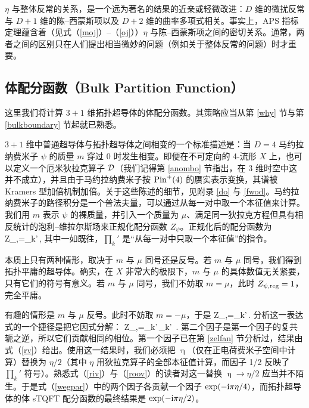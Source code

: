 $\eta$ 与整体反常的关系，是一个远为著名的结果的近亲或轻微改进：$D$ 维的微扰反常与 $D+1$ 维的陈--西蒙斯项以及 $D+2$ 维的曲率多项式相关。事实上，APS 指标定理蕴含着（见式（\ref{moj}）--（\ref{oj}））$\eta$ 与陈--西蒙斯项之间的密切关系。通常，两者之间的区别只在人们提出相当微妙的问题（例如关于整体反常的问题）时才重要。

\subsection{体配分函数（Bulk Partition Function）}\label{bpf}

这里我们将计算 $3+1$ 维拓扑超导体的体配分函数。其策略应当从第 \ref{why} 节与第 \ref{bulkboundary} 节起就已熟悉。

$3+1$ 维中普通超导体与拓扑超导体之间相变的一个标准描述是：当 $D=4$ 马约拉纳费米子 $\psi$ 的质量 $m$ 穿过 0 时发生相变。即便在不可定向的 4-流形 $X$ 上，也可以定义一个厄米狄拉克算子 ${\mathcal D}$（我们记得第 \ref{anombo} 节指出，在 3 维时空中这并不成立），并且由于马约拉纳费米子按 ${\mathrm{Pin}}^+(4)$ 的赝实表示变换，其谱被 Kramers 型加倍机制加倍。关于这些陈述的细节，见附录 \ref{do} 与 \ref{fwod}。马约拉纳费米子的路径积分是一个普法夫量，可以通过从每一对中取一个本征值来计算。我们用 $m$ 表示 $\psi$ 的裸质量，并引入一个质量为 $\mu$、满足同一狄拉克方程但具有相反统计的泡利--维拉尔斯场来正规化配分函数 $Z_\psi$。正规化后的配分函数为
\be\label{regpar}Z_{\psi,\reg}=\prod_k{}'\,,  \ee
其中一如既往，$\prod_k'$ 是“从每一对中只取一个本征值”的指令。


本质上只有两种情形，取决于 $m$ 与 $\mu$ 同号还是反号。若 $m$ 与 $\mu$ 同号，我们得到拓扑平庸的超导体。确实，在 $X$ 非常大的极限下，$m$ 与 $\mu$ 的具体数值无关紧要，只有它们的符号有意义。若 $m$ 与 $\mu$ 同号，我们不妨取 $m=\mu$，此时 $Z_{\psi,{\mathrm{reg}}}=1$，完全平庸。

有趣的情形是 $m$ 与 $\mu$ 反号。此时不妨取 $m=-\mu$，于是
\be\label{negpar}Z_{\psi,\reg}=\prod_k{}'\,. \ee
分析这一表达式的一个捷径是把它因式分解：
\be\label{wegpar}Z_{\psi,\reg}=\prod_k{}'\,\cdot \prod_k{}'\, . \ee
第二个因子是第一个因子的复共轭之逆，所以它们贡献相同的相位。第一个因子已在第 \ref{zelfan} 节分析过，结果由式（\ref{rv}）给出。使用这一结果时，我们必须把 $\upeta$（仅在正电荷费米子空间中计算）替换为 $\eta/2$（其中 $\eta$ 用狄拉克算子的全部本征值计算，而因子 1/2 反映了 $\prod_k'$ 符号）。熟悉式（\ref{riv}）与（\ref{roov}）的读者对这一替换 $\upeta\to \eta/2$ 应当并不陌生。于是式（\ref{wegpar}）中的两个因子各贡献一个因子 $\exp(-{\mathrm i}\pi\eta/4)$，而拓扑超导体的体 sTQFT 配分函数的最终结果是 $\exp(-{\mathrm i}\pi\eta/2)$。


